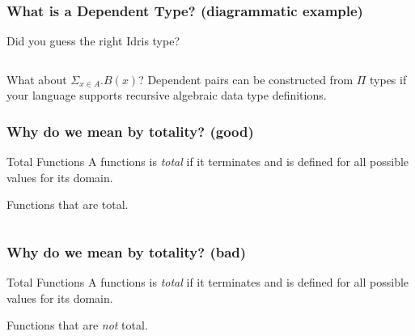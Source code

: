 \documentclass
  [hyperref={colorlinks = true,linkcolor = blue, 
             citecolor = blue, urlcolor = blue}
  ]{beamer}
\begin{document}
\begin{frame}[fragile]
\frametitle{What is a Dependent Type? (diagrammatic example)}

\begin{block}{Did you guess the right Idris type?}
  \inputminted{idris}{../Code/src/PiDiagramExample.idr}
\end{block}

\begin{block}{What about $\Sigma_{x \in A}.B(x)$?}
Dependent pairs can be constructed from $\Pi$ types if
your language supports recursive algebraic data type
definitions.
\end{block}
\end{frame}

\begin{frame}[fragile]
\frametitle{Why do we mean by totality? (good)}
\begin{block}{Total Functions}
A functions is \textit{total} if it terminates and is defined
for all possible values for its domain.
\end{block}
\begin{block}{Functions that are total.}
  \inputminted{idris}{../Code/src/TotalExample.idr}
\end{block}
\end{frame}

\begin{frame}[fragile]
\frametitle{Why do we mean by totality? (bad)}
\begin{block}{Total Functions}
A functions is \textit{total} if it terminates and is defined
for all possible values for its domain.
\end{block}
\begin{block}{Functions that are \textit{not} total.}
  \inputminted{idris}{../Code/src/TotalBadExample.idr}
\end{block}
\end{frame}
\end{document}
